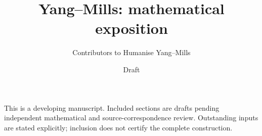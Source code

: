 \documentclass[11pt]{article}
\title{Yang--Mills: mathematical exposition}
\author{Contributors to Humanise Yang--Mills}
\date{Draft}
\begin{document}
\maketitle
\noindent This is a developing manuscript. Included sections are drafts pending
independent mathematical and source-correspondence review. Outstanding inputs
are stated explicitly; inclusion does not certify the complete construction.



\end{document}
